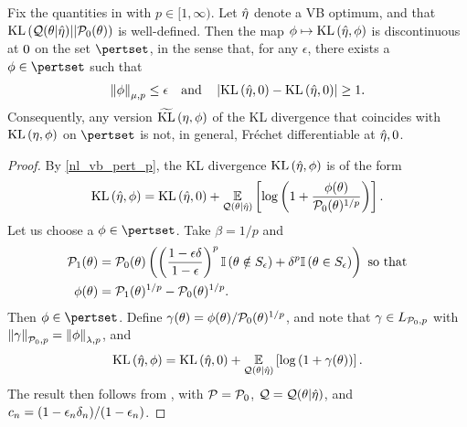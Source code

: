 %
\begin{thm}
%
Fix the quantities in  with $p \in [1, \infty)$.  Let
$\hat\eta$ denote a VB optimum, and that $\mathrm{KL}\left(\mathcal{Q}(\theta \vert \hat\eta) ||
\mathcal{P}_{0}(\theta)\right)$ is well-defined. Then the map $\phi \mapsto \mathrm{KL}\left(\hat\eta, \phi\right)$
is discontinuous at $0$ on the set $\pertset$, in the sense that, for any
$\epsilon$, there exists a $\phi \in \pertset$ such that
%
\begin{align*}
%
\norm{\phi}_{\mu,p} \le \epsilon \mathand
\abs{\KL{\etaopt, \phiz} - \KL{\etaopt, \phiz}} \ge 1.
%
\end{align*}
%
Consequently, any version $\widetilde{\mathrm{KL}}\left(\eta, \phi\right)$ of the KL divergence that
coincides with $\mathrm{KL}\left(\eta, \phi\right)$ on $\pertset$ is not, in general, Fr{\'e}chet
differentiable at $\hat\eta, 0$.
%
\begin{proof}
%

By \eqref{nl_vb_pert_p}, the KL divergence $\mathrm{KL}\left(\hat\eta, \phi\right)$ is of the form
%
\begin{align*}
%
\KL{\etaopt, \phi} = \KL{\etaopt, \phiz} +
\expect{\q(\theta \vert \etaopt)}{
    \log\left(1 + \frac{\phi(\theta)}{\pbase(\theta)^{1/p}}\right)
}.
%
\end{align*}
%
Let us choose a $\phi \in \pertset$.  Take $\beta = 1/p$ and
%
\begin{align*}
%
\palt(\theta) ={}&
    \pbase(\theta)\left(
        \left( \frac{1 - \epsilon\delta}{1 - \epsilon}\right)^{p}
        \ind{\theta \notin S_{\epsilon}} +
        \delta^{p} \ind{\theta \in S_{\epsilon}}
    \right) \textrm{ so that}
\\
\phi(\theta) ={}& \palt(\theta)^{1/p} - \pbase(\theta)^{1/p}.
%
\end{align*}
%
Then $\phi \in \pertset$.   Define $\gamma(\theta) = \phi(\theta) /
\mathcal{P}_{0}(\theta)^{1/p}$, and note that $\gamma \in {L_{\mathcal{P}_{0}, p}}$ with
$\left\Vert\gamma\right\Vert_{\mathcal{P}_{0}, p} = \left\Vert\phi\right\Vert_{\lambda, p}$, and
%
\begin{align*}
%
\KL{\etaopt, \phi} = \KL{\etaopt, \phiz} +
\expect{\q(\theta \vert \etaopt)}{\log\left(1 + \gamma(\theta)\right)}.
%
\end{align*}
%
The result then follows from , with $\mathcal{P} =
\mathcal{P}_{0}$,  $\mathcal{Q} = \mathcal{Q}(\theta \vert \hat\eta)$, and $c_n = (1 - \epsilon_n \delta_n) /
(1 - \epsilon_n)$.
%
\end{proof}
%
\end{thm}

